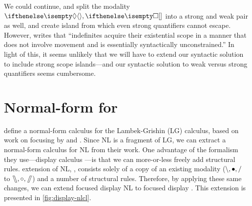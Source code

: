 \documentclass[10pt,a4paper]{llncs}
\begin{document}
We could continue, and split the modality $\di,\sq$ into a strong and
weak pair as well, and create island from which even strong
quantifiers cannot escape. However, \citet{szabolcsi2000} writes that
``indefinites acquire their existential scope in a manner that does
not involve movement and is essentially syntactically unconstrained.''
In light of this, it seems unlikely that we will have to extend our
syntactic solution to include strong scope islands---and our syntactic
solution to weak versus strong quantifiers seems cumbersome.


\section{Normal-form for {\NLCL}}
\label{sec:normal-form}
\citet[][sec. 3.1]{moortgat2012} define a normal-form calculus for the
Lambek-Grishin (LG) calculus, based on work on focusing by
\citet{andreoli2001} and \citet{bastenhof2011}.
Since NL is a fragment of LG, we can extract a normal-form calculus
for NL from their work. One advantage of the formalism they
use---display calculus \citep{belnap1982}---is that we can
more-or-less freely add structural rules.
 extension of NL, {\NLCL}, consists solely of a copy
of an existing modality ($\backslash,\bullet,\slash$ to $\fatbslash,\mathbin{\circ},\mathbin{\!\fatslash\,}$)
and a number of structural rules. Therefore, by applying these same
changes, we can extend focused display NL to focused display {\NLCL}.
This extension is presented in \autoref{fig:display-nlcl}.


\end{document}
